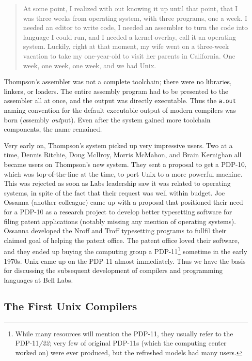 \begin{quotation}
	At some point, I realized with out knowing it up until that point, that I was
	three weeks from operating system, with three programs, one a week. I needed an
	editor to write code, I needed an assembler to turn the code into language I
	could run, and I needed a kernel overlay, call it an operating system.
	Luckily, right at that moment, my wife went on a three-week vacation to take my
	one-year-old to visit her parents in California. One week, one week, one week,
	and we had Unix.
\end{quotation}

Thompson's assembler was not a complete toolchain; there were no libraries, linkers, or loaders.
The entire assembly program had to be presented to the assembler all at once,
and the output was directly executable. Thus the \texttt{a.out} naming convention for
the default executable output of modern compilers was born (\textit{a}ssembly \textit{out}put).
Even after the system gained more toolchain components, the name remained.

Very early on, Thompson's system picked up very impressive users.
Two at a time, Dennis Ritchie, Doug McIlroy, Morris McMahon, and Brain Kernighan
all became users on Thompson's new system.
They sent a proposal to get a PDP-10, which was top-of-the-line at the time,
to port Unix to a more powerful machine.
This was rejected as soon as Labs leadership saw it was related to operating systems,
in spite of the fact that their request was well within budget.
Joe Ossanna (another colleague) came up with a proposal that
positioned their need for a PDP-10 as a research project to develop better typesetting
software for filing patent applications (notably missing any mention of operating
systems).
Ossanna developed the Nroff and Troff typesetting programs to fullfil their claimed
goal of helping the patent office.
The patent office loved their software, and they ended up buying the computing group
a PDP-11\footnote{While many resources will mention the PDP-11, they usually refer to the
	PDP-11\textit{/22}; very few of original PDP-11s (which the computing center worked on)
	were ever produced, but the refreshed models had many users.} sometime in the early 1970s.
Unix came up on the PDP-11 almost immediately.
Thus we have the basis for discussing the subsequent development of compilers
and programming languages at Bell Labs.



\subsection{The First Unix Compilers}

